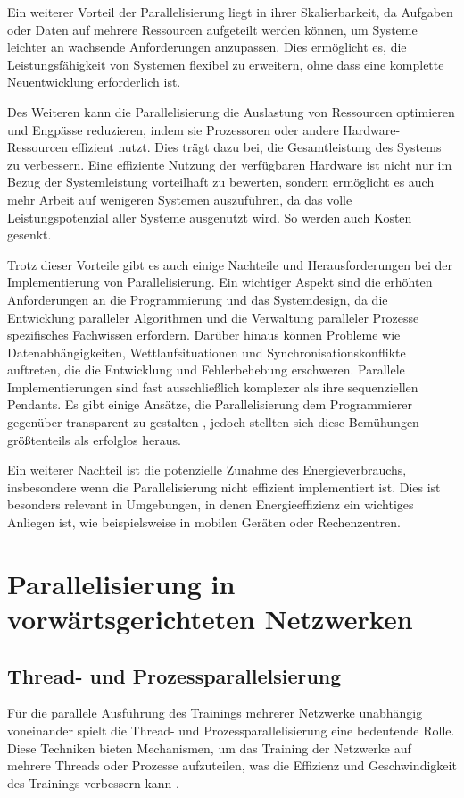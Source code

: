 Ein weiterer Vorteil der Parallelisierung liegt in ihrer Skalierbarkeit, da Aufgaben oder Daten auf mehrere Ressourcen aufgeteilt werden können, um Systeme leichter an wachsende Anforderungen anzupassen. Dies ermöglicht es, die Leistungsfähigkeit von Systemen flexibel zu erweitern, ohne dass eine komplette Neuentwicklung erforderlich ist.

Des Weiteren kann die Parallelisierung die Auslastung von Ressourcen optimieren und Engpässe reduzieren, indem sie Prozessoren oder andere Hardware-Ressourcen effizient nutzt. Dies trägt dazu bei, die Gesamtleistung des Systems zu verbessern. Eine effiziente Nutzung der verfügbaren Hardware ist nicht nur im Bezug der Systemleistung vorteilhaft zu bewerten, sondern ermöglicht es auch mehr Arbeit auf wenigeren Systemen auszuführen, da das volle Leistungspotenzial aller Systeme ausgenutzt wird. So werden auch Kosten gesenkt.

Trotz dieser Vorteile gibt es auch einige Nachteile und Herausforderungen bei der Implementierung von Parallelisierung. Ein wichtiger Aspekt sind die erhöhten Anforderungen an die Programmierung und das Systemdesign, da die Entwicklung paralleler Algorithmen und die Verwaltung paralleler Prozesse spezifisches Fachwissen erfordern. Darüber hinaus können Probleme wie Datenabhängigkeiten, Wettlaufsituationen und Synchronisationskonflikte auftreten, die die Entwicklung und Fehlerbehebung erschweren. Parallele Implementierungen sind fast ausschließlich komplexer als ihre sequenziellen Pendants. Es gibt einige Ansätze, die Parallelisierung dem Programmierer gegenüber transparent zu gestalten \citep{Sidorenko_Subway_Train_Scheduling}, jedoch stellten sich diese Bemühungen größtenteils als erfolglos heraus.

Ein weiterer Nachteil ist die potenzielle Zunahme des Energieverbrauchs, insbesondere wenn die Parallelisierung nicht effizient implementiert ist. Dies ist besonders relevant in Umgebungen, in denen Energieeffizienz ein wichtiges Anliegen ist, wie beispielsweise in mobilen Geräten oder Rechenzentren.

\section{Parallelisierung in vorwärtsgerichteten Netzwerken}
\label{sec:Grundlagen_Parallelisierung_Neuronale_Netze}
\subsection{Thread- und Prozessparallelsierung}
\label{sec:Grundlagen_Thread_Parallelisierung}
Für die parallele Ausführung des Trainings mehrerer Netzwerke unabhängig voneinander spielt die Thread- und Prozessparallelisierung eine bedeutende Rolle. Diese Techniken bieten Mechanismen, um das Training der Netzwerke auf mehrere Threads oder Prozesse aufzuteilen, was die Effizienz und Geschwindigkeit des Trainings verbessern kann \citep{Flynn_Computer_Organizations_and_their_Effectiveness}.

